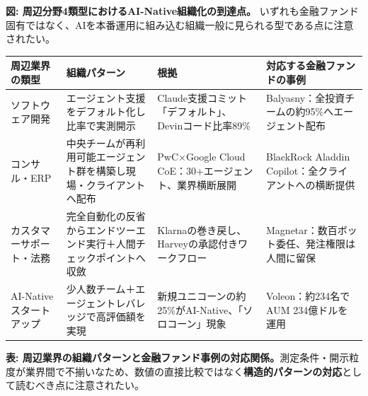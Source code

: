 \smallskip
{\small\color{figgray}\textbf{図: 周辺分野4類型におけるAI-Native組織化の到達点。}}\cite{y03anthropic2026ainativeorg,y03techcrunch2026cognitionraise,y03pwc2026googlecoe,y03forbes2026sapautonomous,y03cxdive2025klarna853,y03fastcompany2026klarnareversal,y03harvey2026raise11b,y03crunchbase2025unicorninvestors} いずれも金融ファンド固有ではなく、AIを本番運用に組み込む組織一般に見られる型である点に注意されたい。

\begin{center}
\footnotesize
\begin{tabularx}{\textwidth}{@{}>{\raggedright\arraybackslash}p{2.6cm} >{\raggedright\arraybackslash}p{3.6cm} >{\raggedright\arraybackslash}X >{\raggedright\arraybackslash}p{3.4cm}@{}}
\toprule
\textbf{周辺業界の類型} & \textbf{組織パターン} & \textbf{根拠} & \textbf{対応する金融ファンドの事例} \\
\midrule
ソフトウェア開発 & エージェント支援をデフォルト化し比率で実測開示 & Claude支援コミット「デフォルト」、Devinコード比率89\%\cite{y03anthropic2026ainativeorg,y03techcrunch2026cognitionraise} & Balyasny：全投資チームの約95\%へエージェント配布\cite{x03balyasny_openai2026} \\
コンサル・ERP & 中央チームが再利用可能エージェント群を構築し現場・クライアントへ配布 & PwC×Google Cloud CoE：30+エージェント、業界横断展開\cite{y03pwc2026googlecoe} & BlackRock Aladdin Copilot：全クライアントへの横断提供\cite{x03blackrock_aladdincopilot} \\
カスタマーサポート・法務 & 完全自動化の反省からエンドツーエンド実行＋人間チェックポイントへ収斂 & Klarnaの巻き戻し、Harveyの承認付きワークフロー\cite{y03fastcompany2026klarnareversal,y03harvey2026raise11b} & Magnetar：数百ボット委任、発注権限は人間に留保\cite{magnetar2026} \\
AI-Nativeスタートアップ & 少人数チーム＋エージェントレバレッジで高評価額を実現 & 新規ユニコーンの約25\%がAI-Native、「ソロコーン」現象\cite{y03crunchbase2025unicorninvestors} & Voleon：約234名でAUM 234億ドルを運用\cite{voleon_wikipedia2026} \\
\bottomrule
\end{tabularx}
\end{center}

\smallskip
{\small\color{figgray}\textbf{表: 周辺業界の組織パターンと金融ファンド事例の対応関係。}}測定条件・開示粒度が業界間で不揃いなため、数値の直接比較ではなく\textbf{構造的パターンの対応}として読むべき点に注意されたい。

